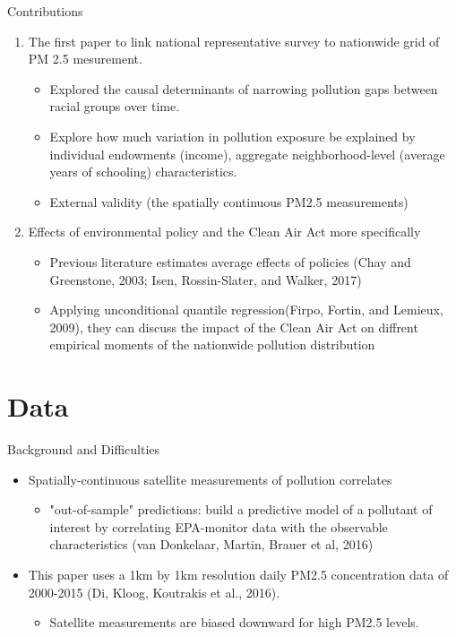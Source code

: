 \documentclass[dvipdfmx,12pt]{beamer}
\begin{document}
\begin{frame}{Contributions}
  \begin{enumerate}
    \item The first paper to link national representative survey to nationwide grid of PM 2.5 mesurement.
    \begin{itemize}
      \item Explored the causal determinants of narrowing pollution gaps between racial groups over time.
      \item Explore how much variation in pollution exposure be explained by individual endowments (income), aggregate neighborhood-level (average years of schooling) characteristics.
      \item External validity (the spatially continuous PM2.5 measurements)
    \end{itemize}
  \end{enumerate}
\end{frame}

\begin{frame}{}
  \begin{enumerate}
    \setcounter{enumi}{1}
    \item Effects of environmental policy
    and the Clean Air Act more specifically
    \begin{itemize}
      \item Previous literature estimates average effects of policies (Chay and Greenstone, 2003; Isen, Rossin-Slater, and Walker, 2017)
      \item Applying unconditional quantile regression(Firpo, Fortin, and Lemieux, 2009), they can discuss the impact of the Clean Air Act on diffrent empirical moments of the nationwide pollution distribution
    \end{itemize}
  \end{enumerate}
\end{frame}

\section{Data}
\frame{\sectionpage}
\begin{frame}{Background and Difficulties}
  \begin{itemize}
    \item Spatially-continuous satellite measurements of pollution correlates
    \begin{itemize}
      \item "out-of-sample" predictions: build a predictive model of a pollutant of interest by correlating EPA-monitor data with the observable characteristics (van Donkelaar, Martin, Brauer et al, 2016)
    \end{itemize}
    \item This paper uses a 1km by 1km resolution daily PM2.5 concentration data of 2000-2015 (Di, Kloog, Koutrakis et al., 2016).
    \begin{itemize}
      \item Satellite measurements are biased downward for high PM2.5 levels.
    \end{itemize}
  \end{itemize}
\end{frame}
\end{document}
